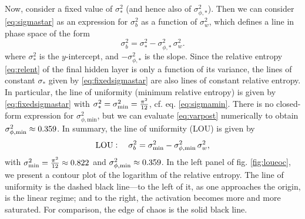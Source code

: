 Now, consider a fixed value of $\sigma_*^2$ (and hence also of $\sigma_{\phi , *}^{2}$). Then we can consider \eqref{eq:sigmastar} as an expression for $\sigma_b^2$ as a function of $\sigma_w^2$, which defines a line in phase space of the form
\begin{equation} \label{eq:fixedsigmastar}
	\sigma_{b}^{2} = \sigma_{*}^{2} - \sigma_{\phi , *}^{2} \, \sigma_{w}^{2}.
\end{equation}
%
where $\sigma_*^2$ is the $y$-intercept, and $- \sigma_{\phi , *}^{2} $ is the slope. Since the relative entropy \eqref{eq:relent} of the final hidden layer is only a function of its variance, the lines of constant $\sigma_*$ given by \eqref{eq:fixedsigmastar} are also lines of constant relative entropy. In particular, the line of uniformity (minimum relative entropy) is given by \eqref{eq:fixedsigmastar} with $\sigma_{*}^{2} = \sigma_{{\rm min}}^{2} = \frac{\pi^2}{12}$, cf. eq. \eqref{eq:sigmamin}. There is no closed-form expression for $\sigma_{\phi,\mathrm{min}}^{2}$, but we can evaluate \eqref{eq:varpost} numerically to obtain $\sigma_{\phi , {\rm min}}^{2} \approx 0.359$. In summary, the line of uniformity (LOU) is given by
%
\begin{equation} \label{eq:lou2}
	{\rm LOU}: \quad \sigma_{b}^{2} = \sigma_{{\rm min}}^{2} - \sigma_{\phi, {\rm min}}^{2} \, \sigma_{w}^{2},
\end{equation}
%
with $\sigma_{{\rm min}}^{2} = \frac{\pi^2}{12} \approx 0.822$ and $\sigma_{\phi, {\rm min}}^{2} \approx 0.359$. In the left panel of fig. \ref{fig:loueoc}, we present a contour plot of the logarithm of the relative entropy. The line of uniformity is the dashed black line---to the left of it, as one approaches the origin, is the linear regime; and to the right, the activation becomes more and more saturated. For comparison, the edge of chaos is the solid black line.
%

